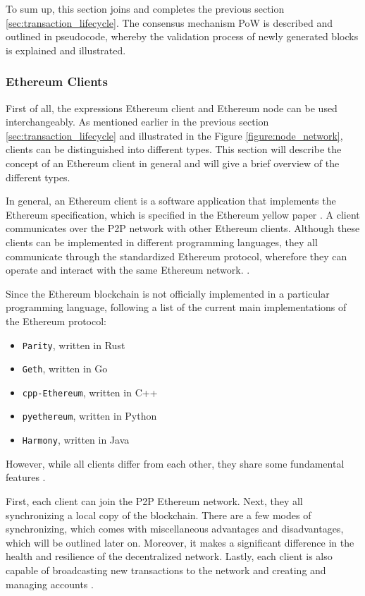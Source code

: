 To sum up, this section joins and completes the previous section \ref{sec:transaction_lifecycle}.
The consensus mechanism PoW is described and outlined in pseudocode, whereby
the validation process of newly generated blocks is explained and illustrated.
\clearpage

\subsubsection{Ethereum Clients}
\label{sec:nodes}

First of all, the expressions Ethereum client and Ethereum node can be used interchangeably. 
As mentioned earlier in the previous section \ref{sec:transaction_lifecycle} 
and illustrated in the Figure \ref{figure:node_network}, clients can be distinguished into different types. 
This section will describe the concept of an Ethereum client in general and will give a brief overview of the different
types.

In general, an Ethereum client is a software application 
that implements the Ethereum specification, which is specified in the Ethereum yellow paper .
A client communicates over the P2P network with other Ethereum clients.
Although these clients can be implemented in different programming languages, they all communicate through
the standardized Ethereum protocol, wherefore they can operate and interact with the same Ethereum network. . 

Since the Ethereum blockchain is not officially implemented in a particular programming language, 
following a list of the current main implementations of the Ethereum protocol:

\begin{itemize}
	\item \texttt{Parity}, written in Rust
	\item \texttt{Geth}, written in Go
	\item \texttt{cpp-Ethereum}, written in C++
	\item \texttt{pyethereum}, written in Python
	\item \texttt{Harmony}, written in Java 
\end{itemize}

However, while all clients differ from each other, they share some fundamental features .

First, each client can join the P2P Ethereum network. 
Next, they all synchronizing a local copy of the blockchain.
There are a few modes of synchronizing, which comes with miscellaneous advantages and disadvantages, 
which will be outlined later on. Moreover, it makes a significant difference 
in the health and resilience of the decentralized network. 
Lastly, each client is also capable of broadcasting new transactions to the network and creating and 
managing accounts .

